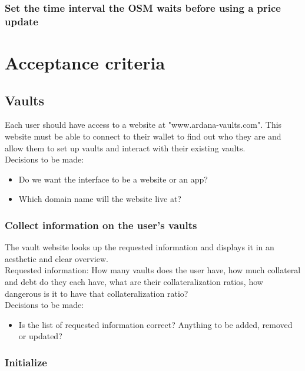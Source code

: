 \documentclass{article} %
\begin{document}
\subsubsection{Set the time interval the OSM waits before using a price update}

\section{Acceptance criteria}

\subsection{Vaults}

Each user should have access to a website at "www.ardana-vaults.com". This
website must be able to connect to their wallet to find out who they are and
allow them to set up vaults and interact with their existing vaults. \\

Decisions to be made:
\begin{itemize}
  \item Do we want the interface to be a website or an app?
  \item Which domain name will the website live at?
\end{itemize}

\subsubsection{Collect information on the user's vaults}

The vault website looks up the requested information and displays it in an
aesthetic and clear overview. \\

Requested information: How many vaults does the user have, how much collateral
and debt do they each have, what are their collateralization ratios, how
dangerous is it to have that collateralization ratio? \\

Decisions to be made:
\begin{itemize}
  \item Is the list of requested information correct? Anything to be added,
    removed or updated?
\end{itemize}

\subsubsection{Initialize}
\end{document}
